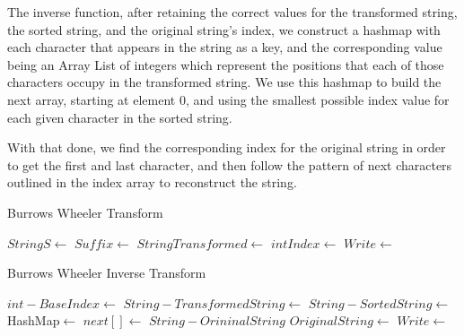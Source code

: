 \documentclass[12pt]{article}
\begin{document}
The inverse function, after retaining the correct values for the transformed string, the sorted string, and the original string's index, we construct a hashmap with each character that appears in the string as a key, and the corresponding value being an Array List of integers which represent the positions that each of those characters occupy in the transformed string. We use this hashmap to build the next array, starting at element $0$, and using the smallest possible index value for each given character in the sorted string.

With that done, we find the corresponding index for the original string in order to get the first and last character, and then follow the pattern of next characters outlined in the index array to reconstruct the string.

\begin{algorithm}[H]
\caption{Burrows Wheeler Transform}
\begin{algorithmic}
        \State $String S \gets$ 
        \State $Suffix \gets$ 
        \State $String Transformed \gets$ 
        \State $int Index \gets$ 
        \State $Write \gets$ 
    \EndProcedure
\end{algorithmic}
\end{algorithm}

\begin{algorithm}[H]
\caption{Burrows Wheeler Inverse Transform}
\begin{algorithmic}
        \State $int- BaseIndex \gets$ 
        \State $String- TransformedString \gets$ 
        \State $String- SortedString \gets$ 
		\State HashMap$\gets$       
        		\State {}
        \EndFor
			\State $next[] \gets$ 
		\EndWhile        
        \State $String- OrininalString${}
            \State $OriginalString \gets$ 
        \EndFor
        \State $Write \gets$ 
    \EndProcedure
\end{algorithmic}
\end{algorithm}
\end{document}
